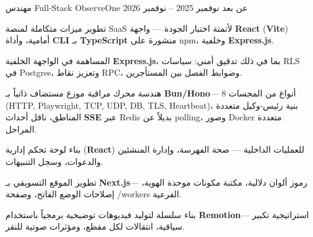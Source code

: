 \begin{cventries}
  \begin{Arabic}

  \cventry
  {\textarabic{مهندس} \textenglish{Full-Stack}}
  {\textenglish{ObserveOne}}
  {\textarabic{عن بعد}}
  {\textarabic{نوفمبر 2025 -- نوفمبر 2026}}
  {
    \begin{cvitems}
      \item {\textarabic{تطوير ميزات متكاملة لمنصة} \textenglish{SaaS} \textarabic{لأتمتة اختبار الجودة — واجهة} \textenglish{\textbf{React}} (\textenglish{\textbf{Vite}}) \textarabic{أمامية، وأداة} \textenglish{\textbf{CLI}} \textarabic{بـ} \textenglish{\textbf{TypeScript}} \textarabic{منشورة على} \textenglish{npm}\textarabic{، وخلفية} \textenglish{\textbf{Express.js}}\textarabic{.}}
      \item {\textarabic{المساهمة في الواجهة الخلفية} \textenglish{\textbf{Express.js}}\textarabic{، بما في ذلك تدقيق أمني: سياسات} \textenglish{RLS} \textarabic{في} \textenglish{Postgres}\textarabic{، وتعزيز نقاط} \textenglish{RPC}\textarabic{، وضوابط الفصل بين المستأجرين}.}
      \item {\textarabic{هندسة محرك مراقبة موزع مستضاف ذاتياً بـ} \textenglish{\textbf{Bun/Hono}}\textarabic{— 8 أنواع من المجسات} \textenglish{(HTTP, Playwright, TCP, UDP, DB, TLS, Heartbeat)}\textarabic{، بنية رئيس-وكيل متعددة المناطق، ناقل أحداث} \textenglish{\textbf{SSE}} \textarabic{عبر} \textenglish{Redis} \textarabic{بديلاً عن} \textenglish{polling}\textarabic{، وصور} \textenglish{Docker} \textarabic{متعددة المراحل}.}
      \item {\textarabic{بناء لوحة تحكم إدارية} (\textenglish{\textbf{React}}) \textarabic{للعمليات الداخلية — صحة الفهرسة، وإدارة المنشئين والدعوات، وسجل التنبيهات}.}
      \item {\textarabic{تطوير الموقع التسويقي بـ} \textenglish{\textbf{Next.js}}\textarabic{— رموز ألوان دلالية، مكتبة مكونات موحدة الهوية، إصلاحات الوضع الفاتح، وصفحة} \textenglish{/workers} \textarabic{الفرعية}.}
      \item {\textarabic{بناء سلسلة لتوليد فيديوهات توضيحية برمجياً باستخدام} \textenglish{\textbf{Remotion}}\textarabic{— استراتيجية تكبير سياقية، انتقالات لكل مقطع، ومؤثرات صوتية للنقر}.}
    \end{cvitems}
  }



\end{Arabic}
\end{cventries}

